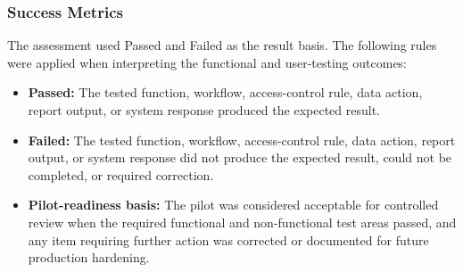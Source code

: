\subsubsection{Success Metrics}

The assessment used Passed and Failed as the result basis. The following rules were applied when interpreting the functional and user-testing outcomes:

\begin{itemize}
    \item \textbf{Passed:} The tested function, workflow, access-control rule, data action, report output, or system response produced the expected result.
    \item \textbf{Failed:} The tested function, workflow, access-control rule, data action, report output, or system response did not produce the expected result, could not be completed, or required correction.
    \item \textbf{Pilot-readiness basis:} The pilot was considered acceptable for controlled review when the required functional and non-functional test areas passed, and any item requiring further action was corrected or documented for future production hardening.
\end{itemize}

